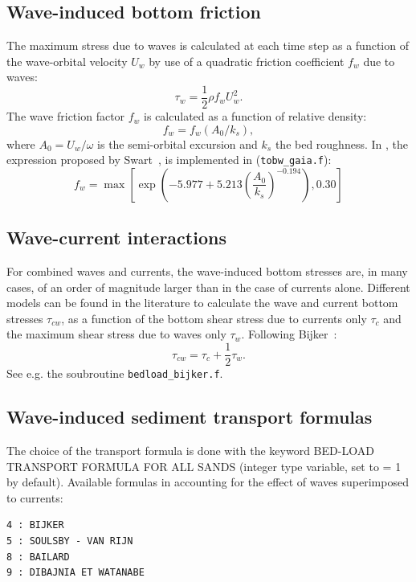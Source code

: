 \subsection{Wave-induced bottom friction}
The maximum stress due to waves is calculated at each time step as a
function of the wave-orbital velocity $U_w$ by use of a quadratic
friction coefficient $f_w$ due to waves:
\begin{equation*}
  \tau_w = \frac{1}{2}\rho f_w U_w^2.
\end{equation*}
The wave friction factor $f_w$ is calculated as a function of relative
density:
\begin{equation*}
f_w = f_w \left( A_0/k_s \right),
\end{equation*}
where $A_0= U_w/\omega$ is the semi-orbital excursion and $k_s$ the bed
roughness.
In \gaia{}, the expression proposed by Swart~\cite{Swart},\cite{Swart1976} is
implemented in (\texttt{tobw\_gaia.f}):
\begin{equation*}
f_w = \max\left[ \exp \left(-5.977 + 5.213\left( \frac{A_0}{k_s} \right)^{-0.194}
 \right), 0.30 \right]
\end{equation*}

\subsection{Wave-current interactions}
For combined waves and currents, the wave-induced bottom
stresses are, in many cases, of an order of magnitude larger than in the case of currents
alone. Different models can be found in the literature to calculate the wave
and current bottom stresses $\tau_{cw}$, as a function of the bottom
shear stress due to currents only $\tau_c$ and the maximum shear
stress due to waves only $\tau_w$. Following Bijker~\cite{Bijker}:
\begin{equation}\label{eq:tauBijker}
\tau_{cw} = \tau_c + \frac{1}{2} \tau_w.
\end{equation}
See e.g. the soubroutine \texttt{bedload\_bijker.f}.

\subsection{Wave-induced sediment transport formulas}
The choice of the transport formula is done with the keyword {\ttfamily BED-LOAD TRANSPORT FORMULA FOR ALL SANDS} (integer type variable, set to {\ttfamily = 1} by default). Available formulas in \gaia{} accounting for the effect of waves superimposed to currents:
\begin{lstlisting}[frame=trBL]
4 : BIJKER
5 : SOULSBY - VAN RIJN
8 : BAILARD
9 : DIBAJNIA ET WATANABE
\end{lstlisting}

